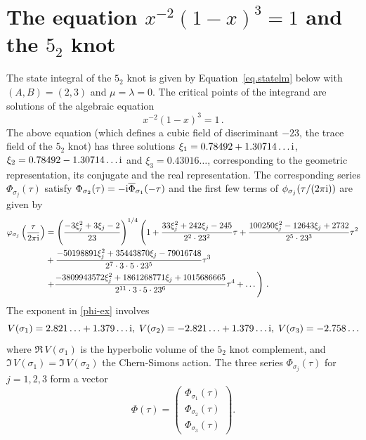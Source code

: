 \documentclass[12pt,reqno]{amsart}
\theoremstyle{definition}
\def\s{\sigma}
\def\ri{\mathrm{i}}
\def\ri{{\rm i}}
\begin{document}

\section{The equation $x^{-2}(1-x)^3=1$ and the $5_2$ knot}
\label{sec.52}

The state integral of the $5_2$ knot is given by
Equation~\eqref{eq.statelm} below with $(A,B)=(2,3)$ and
$\mu=\lambda=0$. The critical points of the integrand are solutions of
the algebraic equation
%
\begin{equation}
  \label{52xi}
  x^{-2}(1-x)^3=1 \,.
\end{equation}
%
The above equation (which defines a cubic field of discriminant $-23$,
the trace field of the $5_2$ knot) has three solutions
$\xi_1=0.78492+1.30714\dots \ri$, $\xi_2=0.78492-1.30714\dots \ri$ and
$\xi_3=0.43016\dots $, corresponding to the geometric representation,
its conjugate and the real representation.  The corresponding series
$\Phi_{\s_j}(\tau)$ satisfy
$\Phi_{\sigma_2}(\tau) = -\ri \overline{\Phi}_{\sigma_1}(-\tau)$ and
the first few terms of $\phi_{\s_j}(\tau/(2\pi \ri))$ are given by
\begin{align}
  \notag
  \varphi_{\s_j}\left(\frac{\tau}{2\pi \ri}\right)
  &=
    \left(\frac{-3\xi_j^2+3\xi_j-2}{23}\right)^{1/4}
    \left(1+\frac{33\xi_j^2+242\xi_j-245}{2^2\cdot 23^2}\tau
    +\frac{100250\xi_j^2-12643\xi_j+2732}{2^5\cdot 23^3}\tau^2\right.
  \\
  \notag
  &+\frac{-50198891\xi_j^2+35443870\xi_j-79016748}
    {2^7\cdot 3\cdot 5\cdot 23^5}\tau^3
  \\
    \label{varphi52}
  &\left.+\frac{-3809943572\xi_j^2+1861268771\xi_j+1015686665}
    {2^{11}\cdot 3\cdot 5 \cdot 23^6}\tau^4+\dots
    \right) \,.
\end{align}
The exponent in \eqref{phi-ex} involves 
\begin{equation}
  V(\sigma_1) = 2.821\ldots+ 1.379\ldots \ri,\;
  V(\sigma_2) = -2.821\ldots+ 1.379\ldots \ri,\;
  V(\sigma_3) = -2.758\ldots 
  \label{eq:V_52}
\end{equation}
where $\Re\,V(\sigma_1)$ is the hyperbolic volume of the $5_2$ knot
complement, and $\Im\,V(\sigma_1) = \Im\,V(\sigma_2)$ the Chern-Simons
action. The three series $\Phi_{\sigma_j}(\tau)$ for $j=1,2,3$ form a
vector
\begin{equation}
  \Phi(\tau) = \left(
    \begin{array}{c}
      \Phi_{\sigma_1}(\tau)\\
      \Phi_{\sigma_2}(\tau)\\
      \Phi_{\sigma_3}(\tau)
    \end{array}
  \right).
  \label{eq:phivec_52}
\end{equation}
\end{document}
